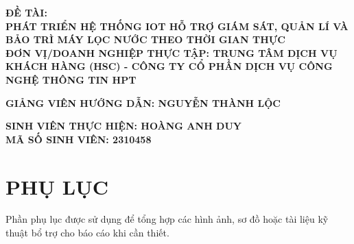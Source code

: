 \documentclass[12pt,a4paper]{article}
\makeatletter
\renewcommand\tableofcontents{%
  \section*{\centering\contentsname
    \@mkboth{%
      \MakeUppercase\contentsname}{\MakeUppercase\contentsname}}%
  \@starttoc{toc}%
}
\makeatother
\begin{document}
\begin{titlepage}
\begin{center}
\fontsize{14pt}{18pt} \selectfont \textbf{ĐỀ TÀI:\\ PHÁT TRIỂN HỆ THỐNG IOT HỖ TRỢ GIÁM SÁT, QUẢN LÍ VÀ BẢO TRÌ MÁY LỌC NƯỚC THEO THỜI GIAN THỰC} \\
\vspace{0.5cm} \textbf{ĐƠN VỊ/DOANH NGHIỆP THỰC TẬP: TRUNG TÂM DỊCH VỤ KHÁCH HÀNG (HSC) - CÔNG TY CỔ PHẦN DỊCH VỤ CÔNG NGHỆ THÔNG TIN HPT}

\end{center}
\vspace{2pt}
\centering
 \textbf{GIẢNG VIÊN HƯỚNG DẪN: NGUYỄN THÀNH LỘC
 \\
   }

\fontsize{12pt}{25pt}\selectfont
{\textbf{SINH VIÊN THỰC HIỆN: HOÀNG ANH DUY}\\
\textbf{MÃ SỐ SINH VIÊN: 2310458 }}
\end{titlepage}


\newpage
\footnotesize
\tableofcontents
\thispagestyle{empty}

\large
\newpage
\footnotesize
{}
    \vspace{-2cm}
\newpage
{}





\appendix
\section{PHỤ LỤC}

Phần phụ lục được sử dụng để tổng hợp các hình ảnh, sơ đồ hoặc tài liệu kỹ thuật bổ trợ cho báo cáo khi cần thiết.
\end{document}
